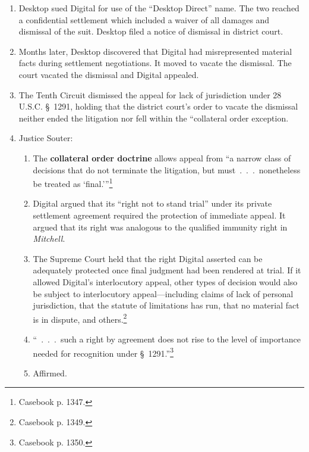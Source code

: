 \begin{enumerate}
    \item Desktop sued Digital for use of the ``Desktop Direct'' name. The two 
    reached a confidential settlement which included a waiver of all damages 
    and dismissal of the suit. Desktop filed a notice of dismissal in district 
    court.
    \item Months later, Desktop discovered that Digital had misrepresented 
    material facts during settlement negotiations. It moved to vacate the 
    dismissal. The court vacated the dismissal and Digital appealed.
    \item The Tenth Circuit dismissed the appeal for lack of jurisdiction 
    under 28 U.S.C. \S\ 1291, holding that the district court's order to 
    vacate the dismissal neither ended the litigation nor fell within the 
    ``collateral order exception.
    \item Justice Souter:
    \begin{enumerate}
        \item The \textbf{collateral order doctrine} allows appeal from 
        \enquote{a narrow class of decisions that do not terminate the 
        litigation, but must~.~.~.~nonetheless be treated as 
        \enquote{final.}}\footnote{Casebook p.  1347.}
        \item Digital argued that its ``right not to stand trial'' under its 
        private settlement agreement required the protection of immediate 
        appeal. It argued that its right was analogous to the qualified 
        immunity right in \emph{Mitchell}.
        \item The Supreme Court held that the right Digital asserted can be 
        adequately protected once final judgment had been rendered at trial. 
        If it allowed Digital's interlocutory appeal, other types of decision
        would also be subject to interlocutory appeal---including claims of 
        lack of personal jurisdiction, that the statute of limitations has 
        run, that no material fact is in dispute, and 
        others.\footnote{Casebook p. 1349.}
        \item ``~.~.~.~such a right by agreement does not rise to the level of 
        importance needed for recognition under \S\ 1291.''\footnote{Casebook 
        p. 1350.}
        \item Affirmed.
    \end{enumerate}
\end{enumerate}

